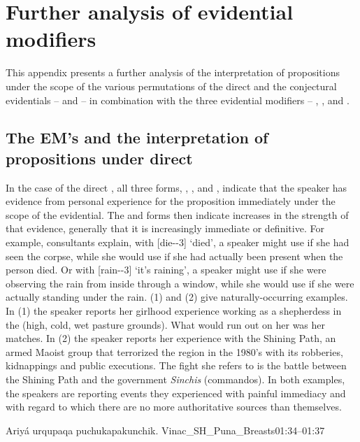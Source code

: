 \chapter{Further analysis of evidential modifiers}

This appendix presents a further analysis of the interpretation of propositions under the scope of the various permutations of the direct and the conjectural evidentials  --  and  -- in combination with the three evidential modifiers --  \phono{-\uo{}},  , and  .

\section{The EM's and the interpretation of propositions under direct }
In the case of the direct , all three forms, , , and , indicate that the speaker has evidence from personal experience for the proposition immediately under the scope of the evidential. The  and  forms then indicate increases in the strength of that evidence, generally that it is increasingly immediate or definitive. For example, consultants explain, with  [die--3] `died', a speaker might use  if she had seen the corpse, while she would use  if she had actually been present when the person died. Or with  [rain--3] `it's raining', a speaker might use  if she were observing the rain from inside through a window, while she would use  if she were actually standing under the rain. (1) and (2) give naturally-occurring  examples. In (1) the speaker reports her girlhood experience working as a shepherdess in the  (high, cold, wet pasture grounds). What would run out on her was her matches. In (2) the speaker reports her experience with the Shining Path, an armed Maoist group that terrorized the region in the 1980's with its robberies, kidnappings and public executions. The fight she refers to is the battle between the Shining Path and the government \emph{Sinchis} (commandos). In both examples, the speakers are reporting events they experienced with painful immediacy and with regard to which there are no more authoritative sources than themselves.

%
{Ariy\'a urqupaqa puchukapakunchik.}%
{}%
{Vinac\_SH\_Puna\_Breasts}{01:34--01:37}%

